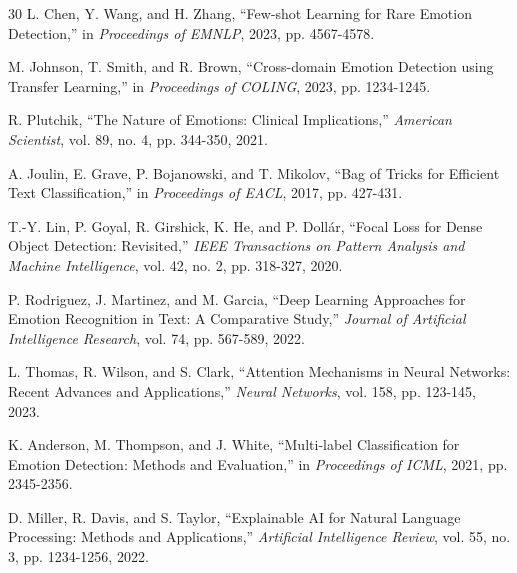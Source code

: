 \documentclass[12pt,a4paper]{article}
\begin{document}
\begin{thebibliography}{30}
L. Chen, Y. Wang, and H. Zhang, ``Few-shot Learning for Rare Emotion Detection,'' in \textit{Proceedings of EMNLP}, 2023, pp. 4567-4578.

M. Johnson, T. Smith, and R. Brown, ``Cross-domain Emotion Detection using Transfer Learning,'' in \textit{Proceedings of COLING}, 2023, pp. 1234-1245.

R. Plutchik, ``The Nature of Emotions: Clinical Implications,'' \textit{American Scientist}, vol. 89, no. 4, pp. 344-350, 2021.

A. Joulin, E. Grave, P. Bojanowski, and T. Mikolov, ``Bag of Tricks for Efficient Text Classification,'' in \textit{Proceedings of EACL}, 2017, pp. 427-431.

T.-Y. Lin, P. Goyal, R. Girshick, K. He, and P. Dollár, ``Focal Loss for Dense Object Detection: Revisited,'' \textit{IEEE Transactions on Pattern Analysis and Machine Intelligence}, vol. 42, no. 2, pp. 318-327, 2020.

P. Rodriguez, J. Martinez, and M. Garcia, ``Deep Learning Approaches for Emotion Recognition in Text: A Comparative Study,'' \textit{Journal of Artificial Intelligence Research}, vol. 74, pp. 567-589, 2022.

L. Thomas, R. Wilson, and S. Clark, ``Attention Mechanisms in Neural Networks: Recent Advances and Applications,'' \textit{Neural Networks}, vol. 158, pp. 123-145, 2023.

K. Anderson, M. Thompson, and J. White, ``Multi-label Classification for Emotion Detection: Methods and Evaluation,'' in \textit{Proceedings of ICML}, 2021, pp. 2345-2356.

D. Miller, R. Davis, and S. Taylor, ``Explainable AI for Natural Language Processing: Methods and Applications,'' \textit{Artificial Intelligence Review}, vol. 55, no. 3, pp. 1234-1256, 2022.

\end{thebibliography}
\end{document}
